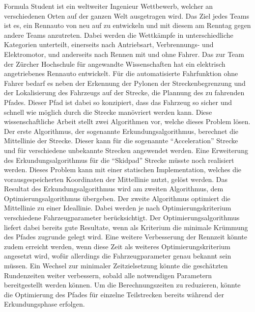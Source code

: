 Formula Student ist ein weltweiter Ingenieur Wettbewerb, welcher an verschiedenen Orten auf der ganzen Welt ausgetragen wird. Das Ziel jedes Teams ist es, ein Rennauto von neu auf zu entwickeln und mit diesem am Renntag gegen andere Teams anzutreten. Dabei werden die Wettkämpfe in unterschiedliche Kategorien unterteilt, einerseits nach Antriebsart, Verbrennungs- und Elektromotor, und anderseits nach Rennen mit und ohne Fahrer. Das \acrlong{zur} Team der Zürcher Hochschule für angewandte Wissenschaften hat ein elektrisch angetriebenes Rennauto entwickelt. Für die automatisierte Fahrfunktion ohne Fahrer bedarf es neben der Erkennung der Pylonen der Streckenbegrenzung und der Lokalisierung des Fahrzeugs auf der Strecke, die Plannung des zu fahrenden Pfades. Dieser Pfad ist dabei so konzipiert, dass das Fahrzeug so sicher und schnell wie möglich durch die Strecke manövriert werden kann. Diese wissenschaftliche Arbeit stellt zwei Algorithmen vor, welche dieses Problem lösen. Der erste Algorithmus, der sogenannte Erkundungsalgorithmus, berechnet die Mittellinie der Strecke. Dieser kann für die sogenannte ``Acceleration'' Strecke und für verschiedene unbekannte Strecken angewendet werden. Eine Erweiterung des Erkundungsalgorithmus für die ``Skidpad'' Strecke müsste noch realisiert werden. Dieses Problem kann mit einer statischen Implementation, welches die vorausgespeicherten Koordinaten der Mittellinie nutzt, gelöst werden. Das Resultat des Erkundungsalgorithmus wird am zweiten Algorithmus, dem Optimierungsalgorithmus übergeben. Der zweite Algorithmus optimiert die Mittellinie zu einer Ideallinie. Dabei werden je nach Optimierungskriterium verschiedene Fahrzeugparameter berücksichtigt. Der Optimierungsalgorithmus liefert dabei bereits gute Resultate, wenn als Kriterium die minimale Krümmung des Pfades zugrunde gelegt wird. Eine weitere Verbesserung der Rennzeit könnte zudem erreicht werden, wenn diese Zeit als weiteres Optimierungskriterium angesetzt wird, wofür allerdings die Fahrzeugparameter genau bekannt sein müssen. Ein Wechsel zur minimaler Zeitzielsetzung könnte die geschätzten Rundenzeiten weiter verbessern, sobald alle notwendigen Parametern bereitgestellt werden können. Um die Berechnungszeiten zu reduzieren, könnte die Optimierung des Pfades für einzelne Teilstrecken bereits während der Erkundungsphase erfolgen.
